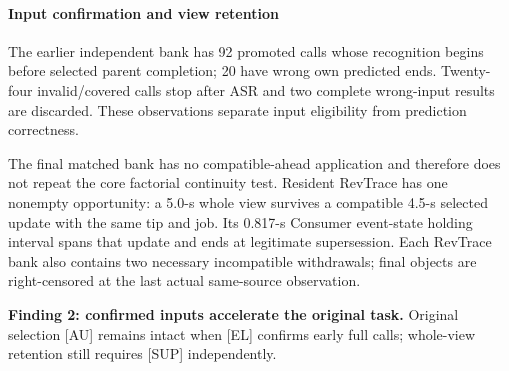 \paragraph{Input confirmation and view retention}
The earlier independent bank has 92 promoted calls whose recognition
begins before selected parent completion; 20 have wrong own predicted
ends. Twenty-four invalid/covered calls stop after ASR and two complete
wrong-input results are discarded. These observations separate input
eligibility from prediction correctness.

The final matched bank has no compatible-ahead application and therefore
does not repeat the core factorial continuity test. Resident RevTrace has
one nonempty opportunity: a 5.0-s whole view survives a compatible 4.5-s
selected update with the same tip and job. Its 0.817-s Consumer event-state
holding interval spans that update and ends at legitimate supersession.
Each RevTrace bank also contains two necessary incompatible withdrawals;
final objects are right-censored at the last actual same-source observation.
\par\noindent\textbf{Finding 2: confirmed inputs accelerate the original task.}
Original selection [AU] remains intact when [EL] confirms early full calls;
whole-view retention still requires [SUP] independently.
